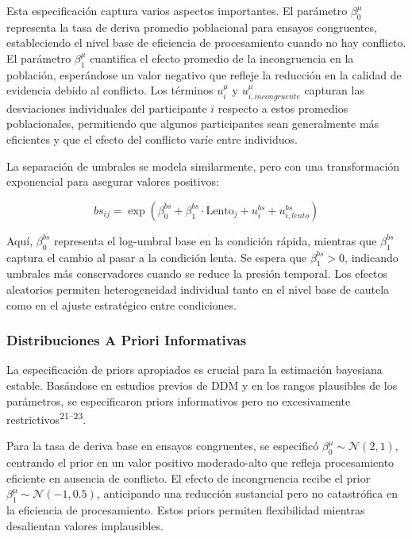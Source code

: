 \documentclass[
  spanish,
  10pt,
]{article}
\begin{document}
Esta especificación captura varios aspectos importantes. El parámetro
\(\beta_0^{\mu}\) representa la tasa de deriva promedio poblacional para
ensayos congruentes, estableciendo el nivel base de eficiencia de
procesamiento cuando no hay conflicto. El parámetro \(\beta_1^{\mu}\)
cuantifica el efecto promedio de la incongruencia en la población,
esperándose un valor negativo que refleje la reducción en la calidad de
evidencia debido al conflicto. Los términos \(u_i^{\mu}\) y
\(u_{i,incongruente}^{\mu}\) capturan las desviaciones individuales del
participante \(i\) respecto a estos promedios poblacionales, permitiendo
que algunos participantes sean generalmente más eficientes y que el
efecto del conflicto varíe entre individuos.

La separación de umbrales se modela similarmente, pero con una
transformación exponencial para asegurar valores positivos:

\[bs_{ij} = \exp(\beta_0^{bs} + \beta_1^{bs} \cdot \text{Lento}_{j} + u_i^{bs} + u_{i,lento}^{bs})\]

Aquí, \(\beta_0^{bs}\) representa el log-umbral base en la condición
rápida, mientras que \(\beta_1^{bs}\) captura el cambio al pasar a la
condición lenta. Se espera que \(\beta_1^{bs} > 0\), indicando umbrales
más conservadores cuando se reduce la presión temporal. Los efectos
aleatorios permiten heterogeneidad individual tanto en el nivel base de
cautela como en el ajuste estratégico entre condiciones.

\subsubsection{Distribuciones A Priori
Informativas}\label{distribuciones-a-priori-informativas}

La especificación de priors apropiados es crucial para la estimación
bayesiana estable. Basándose en estudios previos de DDM y en los rangos
plausibles de los parámetros, se especificaron priors informativos pero
no excesivamente restrictivos\textsuperscript{21--23}.

Para la tasa de deriva base en ensayos congruentes, se especificó
\(\beta_0^{\mu} \sim \mathcal{N}(2, 1)\), centrando el prior en un valor
positivo moderado-alto que refleja procesamiento eficiente en ausencia
de conflicto. El efecto de incongruencia recibe el prior
\(\beta_1^{\mu} \sim \mathcal{N}(-1, 0.5)\), anticipando una reducción
sustancial pero no catastrófica en la eficiencia de procesamiento. Estos
priors permiten flexibilidad mientras desalientan valores implausibles.
\end{document}
